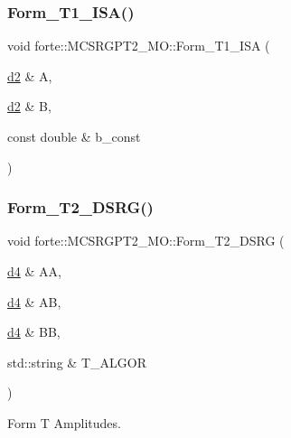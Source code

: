 \subsubsection{\texorpdfstring{Form\+\_\+\+T1\+\_\+\+I\+S\+A()}{Form\_T1\_ISA()}}
{\footnotesize\ttfamily void forte\+::\+M\+C\+S\+R\+G\+P\+T2\+\_\+\+M\+O\+::\+Form\+\_\+\+T1\+\_\+\+I\+SA (\begin{DoxyParamCaption}\item[{\mbox{\hyperlink{mcsrgpt2__mo_8h_ae5de8a172a3b363a852d6d32e6d90537}{d2}} \&}]{A,  }\item[{\mbox{\hyperlink{mcsrgpt2__mo_8h_ae5de8a172a3b363a852d6d32e6d90537}{d2}} \&}]{B,  }\item[{const double \&}]{b\+\_\+const }\end{DoxyParamCaption})\hspace{0.3cm}{\ttfamily [protected]}}

\mbox{\label{classforte_1_1_m_c_s_r_g_p_t2___m_o_a0ed08f7a03042f89508ab41377d970ea}} 
\subsubsection{\texorpdfstring{Form\+\_\+\+T2\+\_\+\+D\+S\+R\+G()}{Form\_T2\_DSRG()}}
{\footnotesize\ttfamily void forte\+::\+M\+C\+S\+R\+G\+P\+T2\+\_\+\+M\+O\+::\+Form\+\_\+\+T2\+\_\+\+D\+S\+RG (\begin{DoxyParamCaption}\item[{\mbox{\hyperlink{mcsrgpt2__mo_8h_a0a2245afece5cd37d3b0b6a462927f69}{d4}} \&}]{AA,  }\item[{\mbox{\hyperlink{mcsrgpt2__mo_8h_a0a2245afece5cd37d3b0b6a462927f69}{d4}} \&}]{AB,  }\item[{\mbox{\hyperlink{mcsrgpt2__mo_8h_a0a2245afece5cd37d3b0b6a462927f69}{d4}} \&}]{BB,  }\item[{std\+::string \&}]{T\+\_\+\+A\+L\+G\+OR }\end{DoxyParamCaption})\hspace{0.3cm}{\ttfamily [protected]}}



Form T Amplitudes. 

